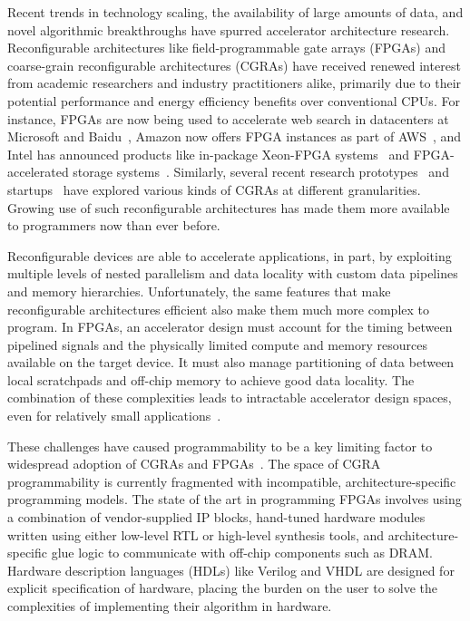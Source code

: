 Recent trends in technology scaling, the availability of large amounts of data, and novel algorithmic breakthroughs have spurred accelerator architecture research. Reconfigurable architectures like field-programmable gate arrays (FPGAs) and coarse-grain reconfigurable architectures (CGRAs) have received renewed interest from academic researchers and industry practitioners alike, primarily due to their potential performance and energy efficiency benefits over conventional CPUs. For instance, FPGAs are now being used to accelerate web search in datacenters at Microsoft and Baidu~\cite{catapult, baidu}, Amazon now offers FPGA instances as part of AWS~\cite{awsf1}, and Intel has announced products like in-package Xeon-FPGA systems~\cite{harp} and FPGA-accelerated storage systems~\cite{nand_flash}. Similarly, several recent research prototypes~\cite{dyser, ti, scaledeep, scnn, plasticine} and startups~\cite{wavecomp, nervana} have explored various kinds of CGRAs at different granularities. Growing use of such reconfigurable architectures has made them more available to programmers now than ever before.

Reconfigurable devices are able to accelerate applications, in part, by exploiting multiple levels of nested parallelism and data locality with custom data pipelines and memory hierarchies. Unfortunately, the same features that make reconfigurable architectures efficient also make them much more complex to program. In FPGAs, an accelerator design must account for the timing between pipelined signals and the physically limited compute and memory resources available on the target device. It must also manage partitioning of data between local scratchpads and off-chip memory to achieve good data locality. The combination of these complexities leads to intractable accelerator design spaces, even for relatively small applications~\cite{cascaval}.

These challenges have caused programmability to be a key limiting factor to widespread adoption of CGRAs and FPGAs~\cite{fpgaMasses,DeSutter2013}. The space of CGRA programmability is currently fragmented with incompatible, architecture-specific programming models. The state of the art in programming FPGAs involves using a combination of vendor-supplied IP blocks, hand-tuned hardware modules written using either low-level RTL or high-level synthesis tools, and architecture-specific glue logic to communicate with off-chip components such as DRAM. Hardware description languages (HDLs) like Verilog and VHDL are designed for explicit specification of hardware, placing the burden on the user to solve the complexities of implementing their algorithm in hardware.


